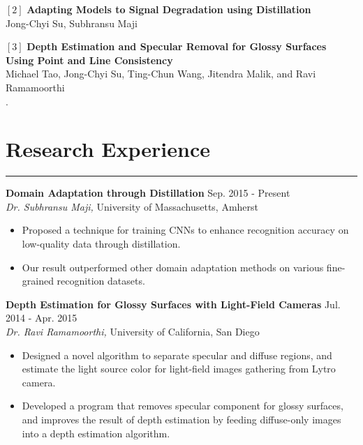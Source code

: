 \documentclass[10pt,letterpaper]{article}
\begin{document}
\vspace{8pt}
\noindent $[2]$ {\bf Adapting Models to Signal Degradation using Distillation}\\
\indent Jong-Chyi Su, Subhransu Maji \\

\vspace{8pt}
\noindent $[3]$ {\bf Depth Estimation and Specular Removal for Glossy Surfaces Using Point and Line Consistency}
\\
\indent Michael Tao, Jong-Chyi Su, Ting-Chun Wang, Jitendra Malik, and Ravi Ramamoorthi \\
.


\section*{Research Experience} \vspace{-5pt}
\hrule \vspace{10pt}

{\bf Domain Adaptation through Distillation} \hfill Sep. 2015 - Present \\
\emph{Dr. Subhransu Maji,} University of Massachusetts, Amherst
\begin{itemize}
\item Proposed a technique for training CNNs to enhance recognition accuracy on low-quality data through distillation.
\item Our result outperformed other domain adaptation methods on various fine-grained recognition datasets.
\end{itemize}
\vspace{10pt}

\noindent
{\bf Depth Estimation for Glossy Surfaces with Light-Field Cameras} \hfill Jul. 2014 - Apr. 2015 \\
\emph{Dr. Ravi Ramamoorthi,} University of California, San Diego
\begin{itemize}
\item Designed a novel algorithm to separate specular and diffuse regions, and estimate the light source color for light-field images gathering from Lytro camera.
\item Developed a program that removes specular component for glossy surfaces, and improves the result of depth estimation by feeding diffuse-only images into a depth estimation algorithm.
\end{itemize}
\vspace{10pt}
\end{document}
